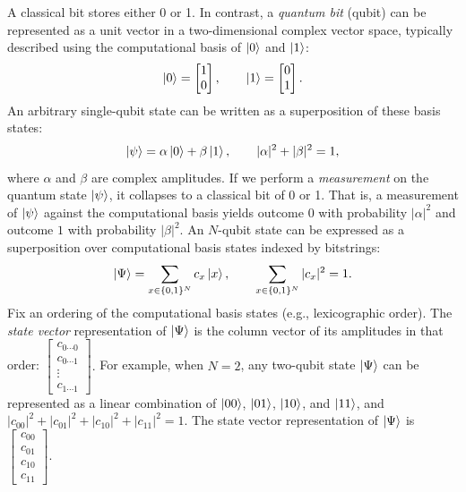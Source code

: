A classical bit stores either 0 or 1. In contrast, a \emph{quantum bit} (qubit) can be represented as a unit vector in a two-dimensional complex vector space, typically described using the computational basis of $\ket{0}$ and $\ket{1}$:
$$
\ket{0}=\begin{bmatrix}1\\0\end{bmatrix},
\qquad
\ket{1}=\begin{bmatrix}0\\1\end{bmatrix}.
$$
An arbitrary single-qubit state can be written as a superposition of these basis states:
$$
\ket{\psi}=\alpha\ket{0}+\beta\ket{1},
\qquad
|\alpha|^2+|\beta|^2=1,
$$
where $\alpha$ and $\beta$ are complex amplitudes. 
If we perform a \emph{measurement} on the quantum state $\ket{\psi}$, it collapses to a classical bit of 0 or 1. That is, a measurement of $\ket{\psi}$ against the computational basis yields outcome $0$ with probability $|\alpha|^2$ and outcome $1$ with probability $|\beta|^2$. 
An $N$-qubit state can be expressed as a superposition over computational basis states indexed by bitstrings:
$$
\ket{\Psi}=\sum_{x\in\{0,1\}^N} c_x \ket{x},
\qquad
\sum_{x\in\{0,1\}^N} |c_x|^2=1.
$$
Fix an ordering of the computational basis states (e.g., lexicographic order). The \emph{state vector}
representation of $\ket{\Psi}$ is the column vector of its amplitudes in that order:
$
\left[\begin{smallmatrix}
c_{0\cdots 0}\\
c_{0\cdots 1}\\
\vdots\\
c_{1\cdots 1}
\end{smallmatrix}\right].
$
For example, when $N=2$, any two-qubit state $\ket{\Psi}$ can be represented as a linear combination of
$\ket{00}$, $\ket{01}$, $\ket{10}$, and $\ket{11}$, and
$|c_{00}|^2+|c_{01}|^2+|c_{10}|^2+|c_{11}|^2=1$.
The state vector representation of $\ket{\Psi}$ is
$
\left[\begin{smallmatrix}
c_{00}\\
c_{01}\\
c_{10}\\
c_{11}
\end{smallmatrix}\right].
$


